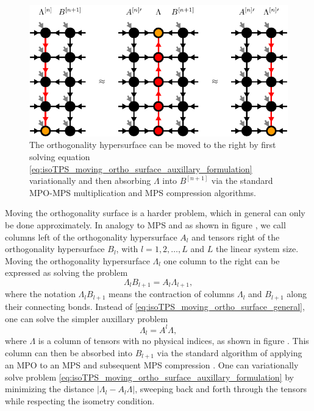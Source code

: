 \begin{figure}
	\centering
	\includegraphics[scale=1]{figures/tikz/Tensor_Networks/isoTPS_moving_ortho_surface/isoTPS_moving_ortho_surface.pdf}
	\caption{The orthogonality hypersurface can be moved to the right by first solving equation \eqref{eq:isoTPS_moving_ortho_surface_auxillary_formulation} variationally and then absorbing $\Lambda$ into $B^{[n+1]}$ via the standard MPO-MPS multiplication and MPS compression algorithms.}
	\label{fig:isoTPS_moving_ortho_column}
\end{figure}
Moving the orthogonality surface is a harder problem, which in general can only be done approximately. In analogy to MPS and as shown in figure , we call columns left of the orthogonality hypersurface $A_l$ and tensors right of the orthogonality hypersurface $B_l$, with $l = 1,2,\dots,L$ and $L$ the linear system size. Moving the orthogonality hypersurface $\Lambda_l$ one column to the right can be expressed as solving the problem
\begin{equation}
	\label{eq:isoTPS_moving_ortho_surface_general}
	\Lambda_l B_{l+1} = A_l \Lambda_{l+1},
\end{equation}
where the notation $\Lambda_l B_{l+1}$ means the contraction of columns $\Lambda_l$ and $B_{l+1}$ along their connecting bonds. Instead of \eqref{eq:isoTPS_moving_ortho_surface_general}, one can solve the simpler auxillary problem
\begin{equation}
	\label{eq:isoTPS_moving_ortho_surface_auxillary_formulation}
	\Lambda_l = A^l \Lambda,
\end{equation}
where $\Lambda$ is a column of tensors with no physical indices, as shown in figure . This column can then be absorbed into $B_{l+1}$ via the standard algorithm of applying an MPO to an MPS and subsequent MPS compression \cite{cite:DMRG_in_the_age_of_MPS}. One can variationally solve problem \eqref{eq:isoTPS_moving_ortho_surface_auxillary_formulation} by minimizing the distance $\left\lvert\Lambda_l-A_l\Lambda\right\rvert$, sweeping back and forth through the tensors while respecting the isometry condition.
